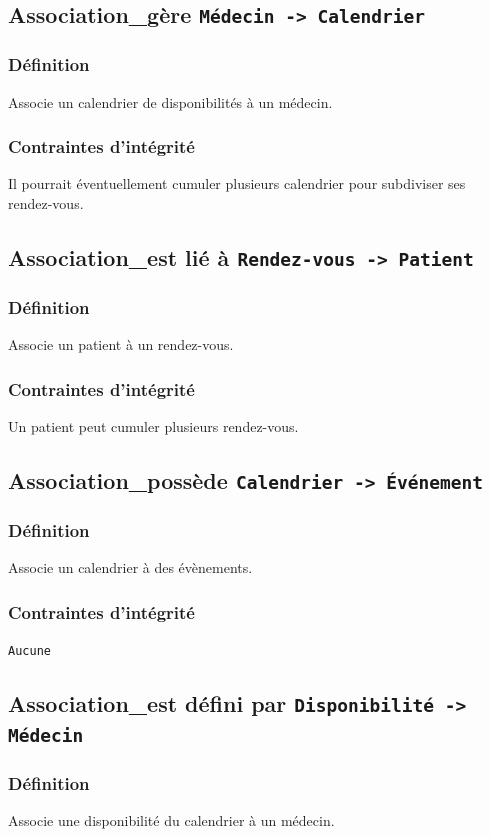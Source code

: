 \documentclass[a4paper, 11pt]{report}
\begin{document}
\subsection{Association\_gère \texttt{Médecin -> Calendrier}}
\subsubsection{Définition}
Associe un calendrier de disponibilités à un médecin.
\subsubsection{Contraintes d'intégrité}
Il pourrait éventuellement cumuler plusieurs calendrier pour subdiviser ses
rendez-vous.

\subsection{Association\_est lié à \texttt{Rendez-vous -> Patient}}
\subsubsection{Définition}
Associe un patient à un rendez-vous.
\subsubsection{Contraintes d'intégrité}
Un patient peut cumuler plusieurs rendez-vous.

\subsection{Association\_possède \texttt{Calendrier -> Événement}}
\subsubsection{Définition}
Associe un calendrier à des évènements.
\subsubsection{Contraintes d'intégrité}
\texttt{Aucune}

\subsection{Association\_est défini par \texttt{Disponibilité -> Médecin}}
\subsubsection{Définition}
Associe une disponibilité du calendrier à un médecin.
\end{document}
